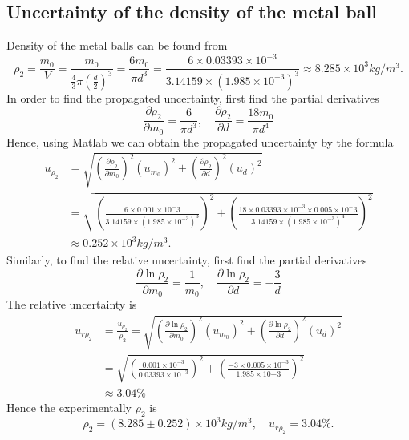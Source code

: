 \subsection{Uncertainty of the density of the metal ball}
    Density of the metal balls can be found from
    \[
        \rho_2=\frac{m_0}{V}=\frac{m_0}{\frac{4}{3}\pi(\frac{d}{2})^3}=\frac{6m_0}{\pi d^3}=\frac{6\times0.03393\times10^{-3}}{3.14159\times(1.985\times10^{-3})^3}\approx 8.285\times10^3 kg/m^3.
    \]
    In order to find the propagated uncertainty, first find the partial derivatives
    \[
        \frac{\partial\rho_2}{\partial m_0}=\frac{6}{\pi d^3},\quad
        \frac{\partial\rho_2}{\partial d}=\frac{18m_0}{\pi d^4}
    \]
    Hence, using Matlab we can obtain the propagated uncertainty by the formula
    \[
    \begin{split}
        u_{\rho_2}&=\sqrt{(\frac{\partial\rho_2}{\partial m_0})^2(u_{m_0})^2+(\frac{\partial\rho_2}{\partial d})^2(u_d)^2}\\
        &=\sqrt{(\frac{6\times 0.001\times10^-3}{3.14159\times (1.985\times10^{-3})^3})^2+(\frac{18\times 0.03393\times10^{-3}\times 0.005\times10^-3}{3.14159\times (1.985\times10^{-3})^4})^2}\\
        &\approx 0.252\times10^3kg/m^3.
    \end{split}
    \]
    Similarly, to find the relative uncertainty, first find the partial derivatives
    \[
        \frac{\partial\ln\rho_2}{\partial m_0}=\frac{1}{m_0},\quad
        \frac{\partial\ln\rho_2}{\partial d}=-\frac{3}{d}
    \]
    The relative uncertainty is
    \[
    \begin{split}
        u_{r\rho_2}&=\frac{u_{\rho_2}}{\bar{\rho_2}}=\sqrt{(\frac{\partial \ln\rho_2}{\partial m_0})^2(u_{m_0})^2+(\frac{\partial \ln\rho_2}{\partial d})^2(u_d)^2}\\
        &=\sqrt{(\frac{0.001\times10^{-3}}{0.03393\times10^{-3}})^2+(\frac{-3\times 0.005\times10^{-3}}{1.985\times10{-3}})^2}\\
        &\approx 3.04\%
    \end{split}
    \]
    Hence the experimentally $\rho_2$ is
    \[
        \rho_2=(8.285\pm 0.252)\times10^3kg/m^3, \quad u_{r\rho_2}=3.04\%.
    \]

